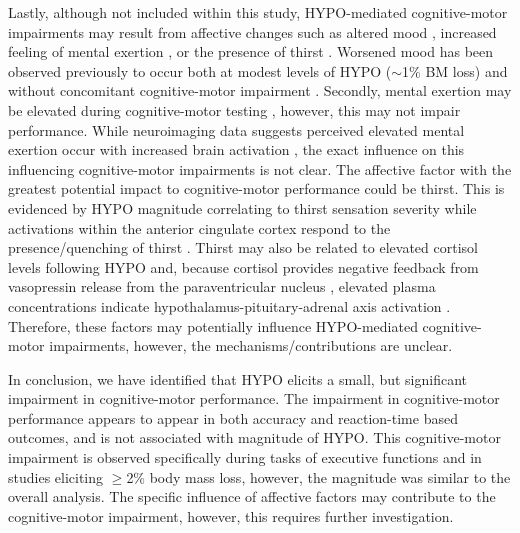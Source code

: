 Lastly, although not included within this study, HYPO-mediated cognitive-motor impairments may result from affective changes such as altered mood \cite{armstrong_mild_2012,masento_effects_2014}, increased feeling of mental exertion \cite{szinnai_effect_2005}, or the presence of thirst \cite{egan_neural_2003}. Worsened mood has been observed previously to occur both at modest levels of HYPO (${\sim}$1\% BM loss) \cite{ganio_mild_2011,armstrong_mild_2012} and without concomitant cognitive-motor impairment \cite{armstrong_mild_2012}. Secondly, mental exertion may be elevated during cognitive-motor testing \cite{szinnai_effect_2005}, however, this may not impair performance. While neuroimaging data suggests perceived elevated mental exertion occur with increased brain activation \cite{kempton_dehydration_2011,watson_mild_2015}, the exact influence on this influencing cognitive-motor impairments is not clear. The affective factor with the greatest potential impact to cognitive-motor performance could be thirst. This is evidenced by HYPO magnitude correlating to thirst sensation severity \cite{engell_thirst_1987} while activations within the anterior cingulate cortex respond to the presence/quenching of thirst \cite{egan_neural_2003}. Thirst may also be related to elevated cortisol levels following HYPO \cite{mcmorris_heat_2006} and, because cortisol provides negative feedback from vasopressin release from the paraventricular nucleus \cite{andreoli_endocrine_2010}, elevated plasma concentrations indicate hypothalamus-pituitary-adrenal axis activation \cite{lieberman_severe_2005}. Therefore, these factors may potentially influence HYPO-mediated cognitive-motor impairments, however, the mechanisms/contributions are unclear. 

In conclusion, we have identified that HYPO elicits a small, but significant impairment in cognitive-motor performance. The impairment in cognitive-motor performance appears to appear in both accuracy and reaction-time based outcomes, and is not associated with magnitude of HYPO. This cognitive-motor impairment is observed specifically during tasks of executive functions and in studies eliciting ${\geq}$2\% body mass loss, however, the magnitude was similar to the overall analysis. The specific influence of affective factors may contribute to the cognitive-motor impairment, however, this requires further investigation. 
 